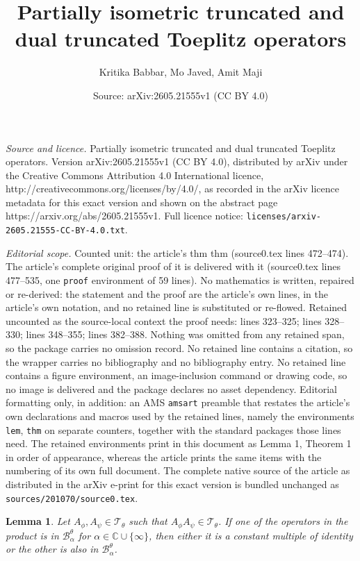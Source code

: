 \documentclass[10pt,a4paper]{amsart}
\title{Partially isometric truncated and dual truncated Toeplitz operators}
\author{Kritika Babbar, Mo Javed, Amit Maji}
\date{Source: arXiv:2605.21555v1 (CC BY 4.0)}
\newtheorem{lem}{Lemma}
\newcommand{\C}{\mathbb{C}}
\begin{document}
\maketitle

\noindent\emph{Source and licence.} Partially isometric truncated and dual truncated Toeplitz operators. Version arXiv:2605.21555v1 (CC BY 4.0), distributed by arXiv under the Creative Commons Attribution 4.0 International licence, http://creativecommons.org/licenses/by/4.0/, as recorded in the arXiv licence metadata for this exact version and shown on the abstract page https://arxiv.org/abs/2605.21555v1. Full licence notice: \texttt{licenses/arxiv-2605.21555-CC-BY-4.0.txt}.\par\smallskip

\noindent\textit{Editorial scope.} Counted unit: the article's thm thm (source0.tex lines 472--474). The article's complete original proof of it is delivered with it (source0.tex lines 477--535, one \texttt{proof} environment of 59 lines). No mathematics is written, repaired or re-derived: the statement and the proof are the article's own lines, in the article's own notation, and no retained line is substituted or re-flowed.  Retained uncounted as the source-local context the proof needs: lines 323--325; lines 328--330; lines 348--355; lines 382--388.  Nothing was omitted from any retained span, so the package carries no omission record.  No retained line contains a citation, so the wrapper carries no bibliography and no bibliography entry.  No retained line contains a figure environment, an image-inclusion command or drawing code, so no image is delivered and the package declares no asset dependency.  Editorial formatting only, in addition: an AMS \texttt{amsart} preamble that restates the article's own declarations and macros used by the retained lines, namely the environments \texttt{lem}, \texttt{thm} on separate counters, together with the standard packages those lines need.  The retained environments print in this document as Lemma 1, Theorem 1 in order of appearance, whereas the article prints the same items with the numbering of its own full document.  The complete native source of the article as distributed in the arXiv e-print for this exact version is bundled unchanged as \texttt{sources/201070/source0.tex}.
\begin{lem}\label{prod}
Let $A_\phi, A_\psi \in \mathscr{T}_{\theta}$ such that $A_\phi A_\psi \in \mathscr{T}_{\theta}$. If one of the operators in the product is in $\mathscr{B}_{\alpha}^{\theta}$ for $\alpha \in \C \cup\{\infty\}$, then either it is a constant multiple of identity or the other is also in $\mathscr{B}_{\alpha}^{\theta}$.
\end{lem}
\end{document}
